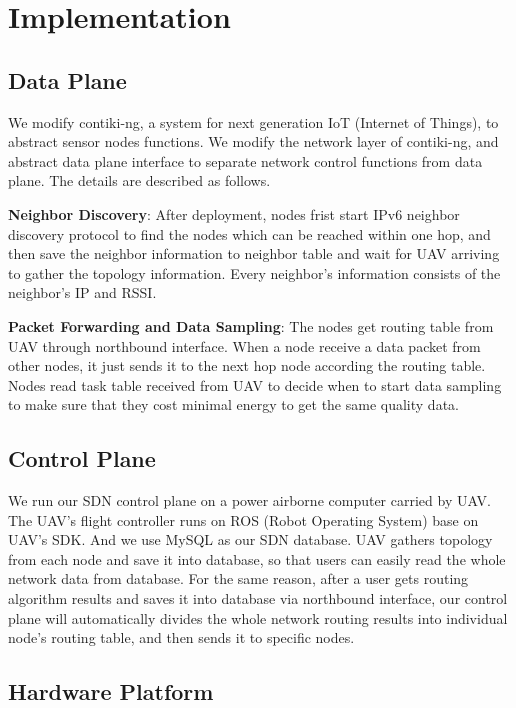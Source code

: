 \section{Implementation}
\label{Imp}



\subsection{Data Plane}

We modify contiki-ng, a system for next generation IoT (Internet of
Things), to abstract sensor nodes functions.
We modify the network layer of contiki-ng, and abstract
data plane interface to separate network control functions from data plane. 
The details are described as follows.

\textbf{Neighbor Discovery}: After deployment, nodes frist start IPv6 neighbor
discovery protocol to find the nodes which can be reached within one hop, and
then save the neighbor information to neighbor table and wait for UAV arriving
to gather the topology information. Every neighbor's information consists of the
neighbor's IP and RSSI. 

\textbf{Packet Forwarding and Data Sampling}: The nodes get routing table from UAV through
northbound interface. When a node receive a data packet from other nodes, it
just sends it to the next hop node according the routing table. Nodes read task
table received from UAV to decide when to start data sampling to make sure 
that they cost minimal energy to get the same
quality data. 

\subsection{Control Plane}

We run our SDN control plane on a power airborne computer carried by UAV. 
The UAV's flight controller runs on ROS (Robot Operating System) base on UAV's SDK.
And we use MySQL as our SDN database. UAV gathers topology from each node and save
it into database, so that users can easily read the whole network data from
database. For the same reason, after a user gets routing algorithm results and
saves it into database via northbound interface, our control plane will
automatically divides the whole network routing results into individual node's
routing table, and then sends it to specific nodes.

\subsection{Hardware Platform}

